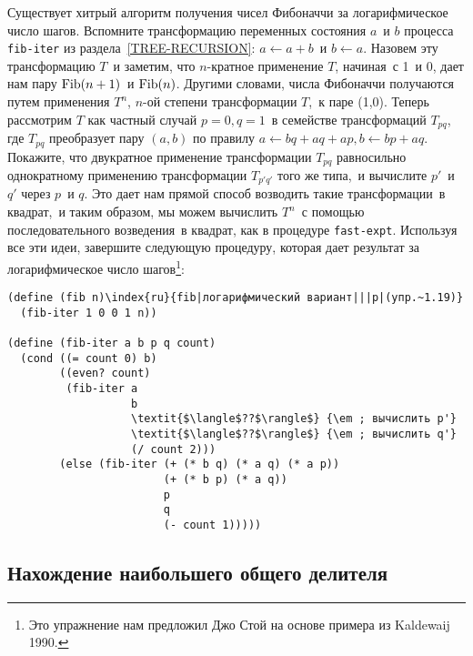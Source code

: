 \begin{exercise}{1.19}\label{EX1.19}%
Существует хитрый алгоритм получения чисел Фибоначчи за
логарифмическое число шагов.  Вспомните трансформацию переменных
состояния $a$~и $b$ процесса
{\tt fib-iter} из раздела~\ref{TREE-RECURSION}:
$a \gets a+b$~и $b \gets a$. Назовем эту
трансформацию $T$~и заметим, что $n$-кратное
применение $T$, начиная~с 1~и 0, дает нам пару
$\mathop{\rm Fib}(n+1)$~и $\mathop{\rm Fib}(n)$.
Другими словами, числа Фибоначчи получаются путем применения
$T^n$, $n$-ой степени трансформации $T$,~к паре (1,0).
Теперь рассмотрим $T$ как частный случай $p = 0, q =
1$~в семействе трансформаций $T_{pq}$, где
$T_{pq}$ преобразует пару $(a,b)$ по правилу
$a \gets bq + aq + ap, b \gets bp + aq$. Покажите, что
двукратное применение трансформации $T_{pq}$ равносильно
однократному применению трансформации $T_{p'q'}$ того же
типа,~и вычислите $p'$~и $q'$ через
$p$~и $q$. Это дает нам прямой способ возводить
такие трансформации~в квадрат,~и таким образом, мы можем вычислить 
$T^n$~с помощью последовательного возведения~в квадрат, как 
в процедуре {\tt fast-expt}.  Используя все эти идеи,
завершите следующую процедуру, которая дает результат за
логарифмическое число шагов\footnote{Это упражнение нам предложил Джо Стой%
%
на основе примера из Kaldewaij 1990.
}:

\begin{Verbatim}
(define (fib n)\index{ru}{fib|логарифмический вариант|||p|(упр.~1.19)}
  (fib-iter 1 0 0 1 n))

(define (fib-iter a b p q count)
  (cond ((= count 0) b)
        ((even? count)
         (fib-iter a
                   b
                   \textit{$\langle$??$\rangle$} {\em ; вычислить p'}
                   \textit{$\langle$??$\rangle$} {\em ; вычислить q'}
                   (/ count 2)))
        (else (fib-iter (+ (* b q) (* a q) (* a p))
                        (+ (* b p) (* a q))
                        p
                        q
                        (- count 1)))))
\end{Verbatim}

\end{exercise}

\subsection{Нахождение наибольшего общего делителя}
\label{GREATEST-COMMON-DIVISORS}


